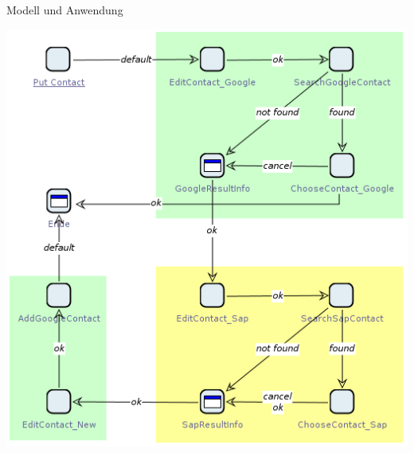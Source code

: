 \subsection*{}
\begin{frame}{Modell und Anwendung}
\begin{center}
\includegraphics[width=\textheight]{Bilder/jabc_Model.png} 
\end{center}
\end{frame}



